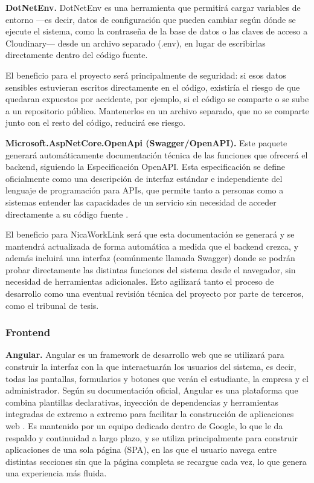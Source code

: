 \textbf{DotNetEnv.} DotNetEnv es una herramienta que permitirá cargar variables de entorno ---es decir, datos de configuración que pueden cambiar según dónde se ejecute el sistema, como la contraseña de la base de datos o las claves de acceso a Cloudinary--- desde un archivo separado (.env), en lugar de escribirlas directamente dentro del código fuente.

El beneficio para el proyecto será principalmente de seguridad: si esos datos sensibles estuvieran escritos directamente en el código, existiría el riesgo de que quedaran expuestos por accidente, por ejemplo, si el código se comparte o se sube a un repositorio público. Mantenerlos en un archivo separado, que no se comparte junto con el resto del código, reducirá ese riesgo.

\textbf{Microsoft.AspNetCore.OpenApi (Swagger/OpenAPI).} Este paquete generará automáticamente documentación técnica de las funciones que ofrecerá el backend, siguiendo la Especificación OpenAPI. Esta especificación se define oficialmente como una descripción de interfaz estándar e independiente del lenguaje de programación para APIs, que permite tanto a personas como a sistemas entender las capacidades de un servicio sin necesidad de acceder directamente a su código fuente \parencite{openapi}.

El beneficio para NicaWorkLink será que esta documentación se generará y se mantendrá actualizada de forma automática a medida que el backend crezca, y además incluirá una interfaz (comúnmente llamada Swagger) donde se podrán probar directamente las distintas funciones del sistema desde el navegador, sin necesidad de herramientas adicionales. Esto agilizará tanto el proceso de desarrollo como una eventual revisión técnica del proyecto por parte de terceros, como el tribunal de tesis.

\subsubsection{Frontend}

\textbf{Angular.} Angular es un framework de desarrollo web que se utilizará para construir la interfaz con la que interactuarán los usuarios del sistema, es decir, todas las pantallas, formularios y botones que verán el estudiante, la empresa y el administrador. Según su documentación oficial, Angular es una plataforma que combina plantillas declarativas, inyección de dependencias y herramientas integradas de extremo a extremo para facilitar la construcción de aplicaciones web \parencite{angular}. Es mantenido por un equipo dedicado dentro de Google, lo que le da respaldo y continuidad a largo plazo, y se utiliza principalmente para construir aplicaciones de una sola página (SPA), en las que el usuario navega entre distintas secciones sin que la página completa se recargue cada vez, lo que genera una experiencia más fluida.

